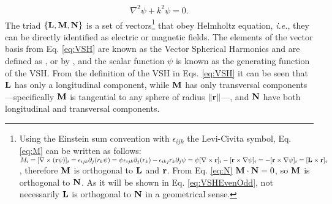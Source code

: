 %
\begin{align}
	\nabla^2 \psi + k^2 \psi = 0.
\label{eq:HelmoltzScalar}
\end{align}
%
The triad $\left\{\vb{L},\vb{M},\vb{N}\right\}$ is a set of vectors\footnote{%
		Using the Einstein sum convention with $\epsilon_{ijk}$ the Levi-Civita symbol, Eq. \eqref{eq:M} can be written as follows: %
	 		$M_i = [\nabla\times(\vb{r}\psi)]_i
	 		=  \epsilon_{ijk}\partial_j(r_k\psi)
	 		=\psi\epsilon_{ijk}\partial_j(r_k) -\epsilon_{ikj}r_k\partial_j\psi
	 		=\psi[\nabla\times\vb{r}]_i - [\vb{r}\times\nabla\psi]_i
	 		= - [\vb{r}\times\nabla\psi]_i
	 		= [\vb{L}\times\vb{r}]_i$,%
	 	therefore $\vb{M}$ is orthogonal to $\vb{L}$ and $\vb{r}$. From Eq. \eqref{eq:N} $\vb{M}\cdot\vb{N}=0$, so $\vb{M}$ is orthogonal to $\vb{N}$. As it will be shown in Eq. \eqref{eq:VSHEvenOdd}, not necessarily $\vb{L}$ is orthogonal to $\vb{N}$ in a geometrical sense.
	} %
 that obey Helmholtz equation, \textit{i.e.}, they can be directly identified as electric or magnetic fields. The elements of the vector basis from Eq. \eqref{eq:VSH}   are known as the Vector Spherical Harmonics and are defined as  \citeauthor{stratton_electromagnetic_2012} \cite{stratton_electromagnetic_2012}, or by \citeauthor{bohren_absorption_1983} \cite{bohren_absorption_1983}, and the scalar function $\psi$ is known as the generating function of the VSH. From the definition of the VSH in Eqs. \eqref{eq:VSH} it can be seen that $\vb{L}$ has only a longitudinal component, while $\vb{M}$ has only transversal components ---specifically $\vb{M}$ is tangential to any sphere of radius $\norm{\vb{r}}$---, and $\vb{N}$ have both longitudinal and transversal components.

